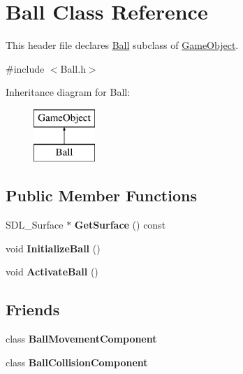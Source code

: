 \hypertarget{class_ball}{}\section{Ball Class Reference}
\label{class_ball}


This header file declares \hyperlink{class_ball}{Ball} subclass of \hyperlink{class_game_object}{Game\+Object}.  




{\ttfamily \#include $<$Ball.\+h$>$}

Inheritance diagram for Ball\+:\begin{figure}[H]
\begin{center}
\leavevmode
\includegraphics[height=2.000000cm]{class_ball}
\end{center}
\end{figure}
\subsection*{Public Member Functions}
\begin{DoxyCompactItemize}
\item 
\hypertarget{class_ball_acffa9c6b9fed01b0c9cd06cec8149a31}{}S\+D\+L\+\_\+\+Surface $\ast$ {\bfseries Get\+Surface} () const \label{class_ball_acffa9c6b9fed01b0c9cd06cec8149a31}

\item 
\hypertarget{class_ball_a883c0f3662079b64a825aa4f93306fb6}{}void {\bfseries Initialize\+Ball} ()\label{class_ball_a883c0f3662079b64a825aa4f93306fb6}

\item 
\hypertarget{class_ball_a206e7dbf1267fe178ba7ecabe705cff7}{}void {\bfseries Activate\+Ball} ()\label{class_ball_a206e7dbf1267fe178ba7ecabe705cff7}

\end{DoxyCompactItemize}
\subsection*{Friends}
\begin{DoxyCompactItemize}
\item 
\hypertarget{class_ball_aa58cdd45353dab2fd0d8e0da60621f73}{}class {\bfseries Ball\+Movement\+Component}\label{class_ball_aa58cdd45353dab2fd0d8e0da60621f73}

\item 
\hypertarget{class_ball_ad6767ce4b36efc15b7aae3cfde953c69}{}class {\bfseries Ball\+Collision\+Component}\label{class_ball_ad6767ce4b36efc15b7aae3cfde953c69}

\end{DoxyCompactItemize}
